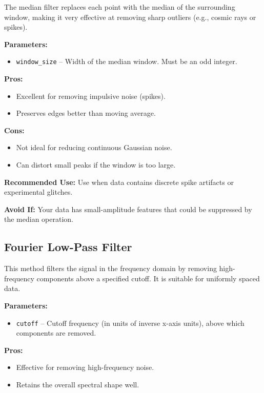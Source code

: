 The median filter replaces each point with the median of the surrounding window, making it very effective at removing sharp outliers (e.g., cosmic rays or spikes).

\textbf{Parameters:}
\begin{itemize}
    \item \texttt{window\_size} – Width of the median window. Must be an odd integer.
\end{itemize}

\textbf{Pros:}
\begin{itemize}
    \item Excellent for removing impulsive noise (spikes).
    \item Preserves edges better than moving average.
\end{itemize}

\textbf{Cons:}
\begin{itemize}
    \item Not ideal for reducing continuous Gaussian noise.
    \item Can distort small peaks if the window is too large.
\end{itemize}

\textbf{Recommended Use:}  
Use when data contains discrete spike artifacts or experimental glitches.

\textbf{Avoid If:}  
Your data has small-amplitude features that could be suppressed by the median operation.

\subsection{Fourier Low-Pass Filter}

This method filters the signal in the frequency domain by removing high-frequency components above a specified cutoff. It is suitable for uniformly spaced data.

\textbf{Parameters:}
\begin{itemize}
    \item \texttt{cutoff} – Cutoff frequency (in units of inverse x-axis units), above which components are removed.
\end{itemize}

\textbf{Pros:}
\begin{itemize}
    \item Effective for removing high-frequency noise.
    \item Retains the overall spectral shape well.
\end{itemize}

